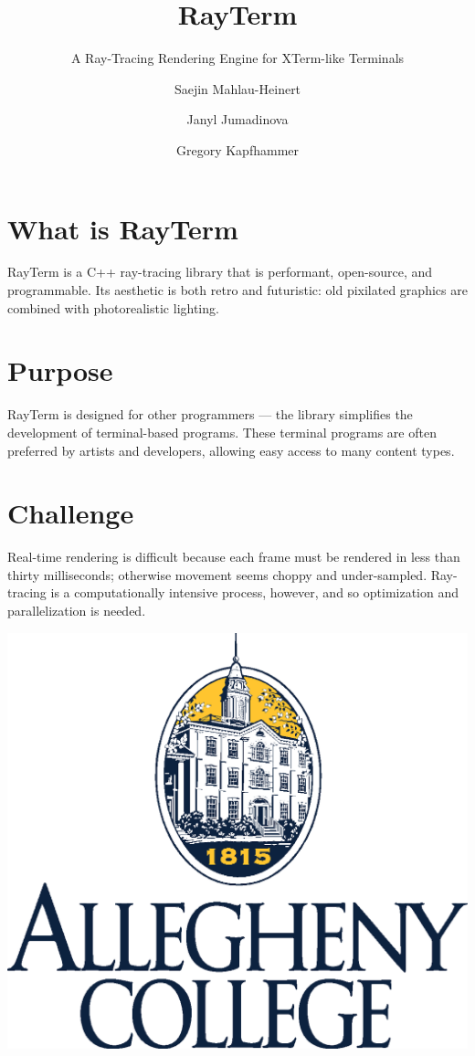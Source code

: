 \documentclass[alleghenyposter]{betterposter}
\begin{document}
{}{

\title{RayTerm}
\subtitle{A Ray-Tracing Rendering Engine for XTerm-like Terminals}
\author{Saejin Mahlau-Heinert}
\author{Janyl Jumadinova}
\author{Gregory Kapfhammer}

\section{What is RayTerm}
RayTerm is a C++ ray-tracing library that is performant, open-source, and programmable.
Its aesthetic is both retro and futuristic: old pixilated graphics are combined with photorealistic lighting.

\section{Purpose}
RayTerm is designed for other programmers --- the library simplifies the development of terminal-based programs.
These terminal programs are often preferred by artists and developers, allowing easy access to many content types.


\section{Challenge}
Real-time rendering is difficult because each frame must be rendered in less than thirty milliseconds; otherwise movement seems choppy and under-sampled.
Ray-tracing is a computationally intensive process, however, and so optimization and parallelization is needed.

\vfill

\includegraphics[width=\textwidth]{img/allegheny-logo}\\

}
\end{document}
